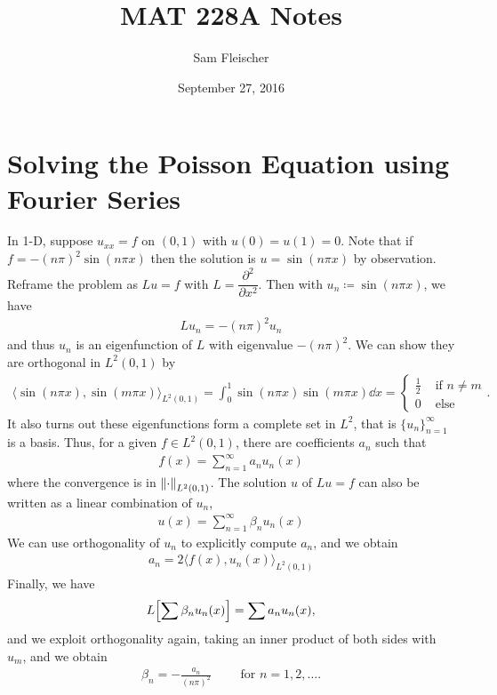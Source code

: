 \documentclass{article}
\title{MAT 228A Notes}
\author{Sam Fleischer}
\date{September 27, 2016}
\begin{document}
    \maketitle

    \section{Solving the Poisson Equation using Fourier Series}
        In 1-D, suppose $u_{xx} = f$ on $(0,1)$ with $u(0) = u(1) = 0$.  Note that if $f = -(n\pi)^2\sin(n\pi x)$ then the solution is $u = \sin(n\pi x)$ by observation.  Reframe the problem as $L u = f$ with $L = \dfrac{\partial^2}{\partial x^2}$.  Then with $u_n \coloneqq \sin (n\pi x)$, we have
        \begin{align}
            Lu_n = -(n\pi)^2 u_n
        \end{align}
        and thus $u_n$ is an eigenfunction of $L$ with eigenvalue $-(n\pi)^2$.  We can show they are orthogonal in $L^2(0,1)$ by
        \begin{align}
            \langle\sin(n\pi x),\sin(m\pi x)\rangle_{L^2(0,1)} = \int_0^1 \sin(n\pi x)\sin(m\pi x)\dd x = \begin{cases}
                \frac{1}{2} & \text{ if } n \neq m \\
                0 & \text{ else }
            \end{cases}.
        \end{align}
        It also turns out these eigenfunctions form a complete set in $L^2$, that is $\{u_n\}_{n=1}^\infty$ is a basis.  Thus, for a given $f \in L^2(0,1)$, there are coefficients $a_n$ such that
        \begin{align}
            f(x) = \sum_{n=1}^\infty a_n u_n(x)
        \end{align}
        where the convergence is in $\norm{\cdot}_{L^2(0,1)}$.  The solution $u$ of $Lu = f$ can also be written as a linear combination of $u_n$,
        \begin{align}
            u(x) = \sum_{n=1}^\infty \beta_n u_n(x)
        \end{align}
        We can use orthogonality of $u_n$ to explicitly compute $a_n$, and we obtain
        \begin{align}
            a_n = 2\langle f(x),u_n(x)\rangle_{L^2(0,1)}
        \end{align}
        Finally, we have
        \begin{align}
            L\qty[\sum \beta_n u_n(x)] = \sum a_n u_n(x),
        \end{align}
        and we exploit orthogonality again, taking an inner product of both sides with $u_m$, and we obtain
        \begin{align}
            \beta_n = -\frac{a_n}{(n\pi)^2} \qquad \text{ for } n = 1, 2, \dots.
        \end{align}
\end{document}
